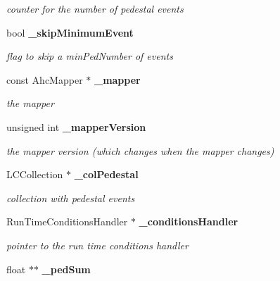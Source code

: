 \begin{DoxyCompactItemize}
\begin{DoxyCompactList}\small\item\em counter for the number of pedestal events \item\end{DoxyCompactList}\item 
bool {\bf \_\-skipMinimumEvent}\label{classCALICE_1_1PedestalProcessor_af2eb3cdd7d27a5033bfd669661e61697}

\begin{DoxyCompactList}\small\item\em flag to skip a minPedNumber of events \item\end{DoxyCompactList}\item 
const AhcMapper $\ast$ {\bf \_\-mapper}\label{classCALICE_1_1PedestalProcessor_ae5162fd017ae4a1abb03921d3bb3bfba}

\begin{DoxyCompactList}\small\item\em the mapper \item\end{DoxyCompactList}\item 
unsigned int {\bf \_\-mapperVersion}\label{classCALICE_1_1PedestalProcessor_aef19163d8be045f83115d034221a3489}

\begin{DoxyCompactList}\small\item\em the mapper version (which changes when the mapper changes) \item\end{DoxyCompactList}\item 
LCCollection $\ast$ {\bf \_\-colPedestal}\label{classCALICE_1_1PedestalProcessor_ab0c600b05c496702970da836d970cd48}

\begin{DoxyCompactList}\small\item\em collection with pedestal events \item\end{DoxyCompactList}\item 
RunTimeConditionsHandler $\ast$ {\bf \_\-conditionsHandler}\label{classCALICE_1_1PedestalProcessor_a3a39a6ea9341d4a6595227bc3947b4ac}

\begin{DoxyCompactList}\small\item\em pointer to the run time conditions handler \item\end{DoxyCompactList}\item 
float $\ast$$\ast$ {\bf \_\-pedSum}\label{classCALICE_1_1PedestalProcessor_a7659ed593bf1fa8c4d6fea3332976765}


\end{DoxyCompactItemize}
